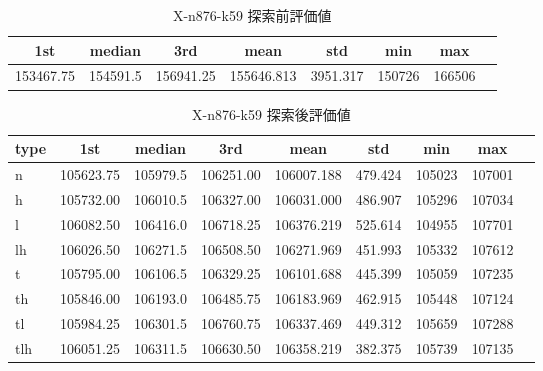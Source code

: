 \begin{table}[htbp]
    \caption{X-n876-k59 探索前評価値}
    \begin{tabular}{|l|l|l|l|l|l|l|l|}\hline
    \multicolumn{1}{|c|}{\textbf{1st}}
    &\multicolumn{1}{c|}{\textbf{median}}
    &\multicolumn{1}{c|}{\textbf{3rd}}
    &\multicolumn{1}{c|}{\textbf{mean}}
    &\multicolumn{1}{c|}{\textbf{std}}
    &\multicolumn{1}{c|}{\textbf{min}}
    &\multicolumn{1}{c|}{\textbf{max}}\\\hline
	153467.75 & 154591.5 & 156941.25 & 155646.813 & 3951.317 & 150726 & 166506\\\hline
	\end{tabular}
\end{table}
\begin{table}[htbp]
    \caption{X-n876-k59 探索後評価値}
    \begin{tabular}{|l|l|l|l|l|l|l|l|l|}\hline
    \multicolumn{1}{|c|}{\textbf{type}}
    &\multicolumn{1}{|c|}{\textbf{1st}}
    &\multicolumn{1}{c|}{\textbf{median}}
    &\multicolumn{1}{c|}{\textbf{3rd}}
    &\multicolumn{1}{c|}{\textbf{mean}}
    &\multicolumn{1}{c|}{\textbf{std}}
    &\multicolumn{1}{c|}{\textbf{min}}
    &\multicolumn{1}{c|}{\textbf{max}}\\\hline
	n & 105623.75 & 105979.5 & 106251.00 & 106007.188 & 479.424 & 105023 & 107001\\\hline
	h & 105732.00 & 106010.5 & 106327.00 & 106031.000 & 486.907 & 105296 & 107034\\\hline
	l & 106082.50 & 106416.0 & 106718.25 & 106376.219 & 525.614 & 104955 & 107701\\\hline
	lh & 106026.50 & 106271.5 & 106508.50 & 106271.969 & 451.993 & 105332 & 107612\\\hline
	t & 105795.00 & 106106.5 & 106329.25 & 106101.688 & 445.399 & 105059 & 107235\\\hline
	th & 105846.00 & 106193.0 & 106485.75 & 106183.969 & 462.915 & 105448 & 107124\\\hline
	tl & 105984.25 & 106301.5 & 106760.75 & 106337.469 & 449.312 & 105659 & 107288\\\hline
	tlh & 106051.25 & 106311.5 & 106630.50 & 106358.219 & 382.375 & 105739 & 107135\\\hline
	\end{tabular}
\end{table}
